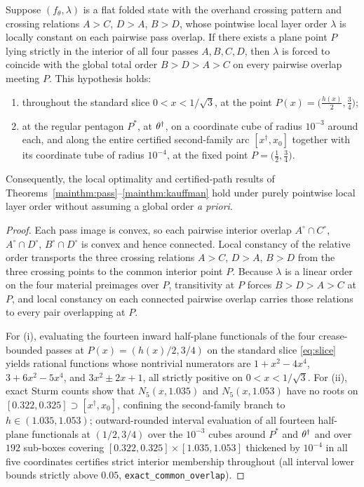 \begin{lemma}\label{lem:common-overlap}
Suppose $(f_\theta,\lambda)$ is a flat folded state with the overhand crossing pattern and crossing relations $A>C$, $D>A$, $B>D$, whose pointwise local layer order $\lambda$ is locally constant on each pairwise pass overlap. If there exists a plane point $P$ lying strictly in the interior of all four passes $A,B,C,D$, then $\lambda$ is forced to coincide with the global total order $B>D>A>C$ on every pairwise overlap meeting $P$. This hypothesis holds:
\begin{enumerate}
\item[(i)] throughout the standard slice $0<x<1/\sqrt3$, at the point $P(x)=\bigl(\frac{h(x)}{2},\frac34\bigr)$;
\item[(ii)] at the regular pentagon $P^*$, at $\theta^\dagger$, on a coordinate cube of radius $10^{-3}$ around each, and along the entire certified second-family arc $[x^\dagger,x_0]$ together with its coordinate tube of radius $10^{-4}$, at the fixed point $P=\bigl(\frac12,\frac34\bigr)$.
\end{enumerate}
Consequently, the local optimality and certified-path results of Theorems~\textup{\ref{mainthm:pass}}--\textup{\ref{mainthm:kauffman}} hold under purely pointwise local layer order without assuming a global order \emph{a priori}.
\end{lemma}

\begin{proof}
Each pass image is convex, so each pairwise interior overlap $A^\circ\cap C^\circ$, $A^\circ\cap D^\circ$, $B^\circ\cap D^\circ$ is convex and hence connected. Local constancy of the relative order transports the three crossing relations $A>C$, $D>A$, $B>D$ from the three crossing points to the common interior point $P$. Because $\lambda$ is a linear order on the four material preimages over $P$, transitivity at $P$ forces $B>D>A>C$ at $P$, and local constancy on each connected pairwise overlap carries those relations to every pair overlapping at $P$.

For \textup{(i)}, evaluating the fourteen inward half-plane functionals of the four crease-bounded passes at $P(x)=(h(x)/2,3/4)$ on the standard slice \eqref{eq:slice} yields rational functions whose nontrivial numerators are $1+x^2-4x^4$, $3+6x^2-5x^4$, and $3x^2\pm2x+1$, all strictly positive on $0<x<1/\sqrt3$. For \textup{(ii)}, exact Sturm counts show that $N_5(x,1.035)$ and $N_5(x,1.053)$ have no roots on $[0.322,0.325]\supset[x^\dagger,x_0]$, confining the second-family branch to $h\in(1.035,1.053)$; outward-rounded interval evaluation of all fourteen half-plane functionals at $(1/2,3/4)$ over the $10^{-3}$ cubes around $P^*$ and $\theta^\dagger$ and over $192$ sub-boxes covering $[0.322,0.325]\times[1.035,1.053]$ thickened by $10^{-4}$ in all five coordinates certifies strict interior membership throughout (all interval lower bounds strictly above $0.05$, \texttt{exact\_common\_overlap}).
\end{proof}

